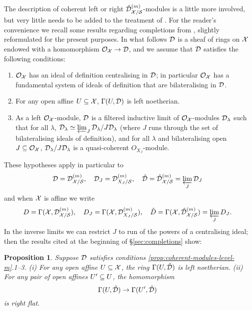 \documentclass{article}
\theoremstyle{change}
\newtheorem{prop}[subsubsection]{Proposition}
\numberwithin{equation}{subsubsection}
\newcommand{\demobox}{\vrule height6pt width6pt depth0pt}
\newcommand{\nodemo}{\unskip\nobreak\hfil\qquad
\demobox\parfillskip=0pt\par}
\begin{document}
The description of coherent left or right
${\hat{\cal D}}^{({m})}_{{\cal X}/{\cal S}}$-modules is a little more involved, but very
little needs to be added to the treatment of
\cite[\S3.3]{berthelot:1996}. For the reader's convenience we recall
some results regarding completions from \cite[\S3.3]{berthelot:1996},
slightly reformulated for the present purposes. In what follows ${\cal D}$
is a sheaf of rings on ${\cal X}$ endowed with a homomorphism
${\cal O}_{\cal X}\to{\cal D}$, and we assume that ${\cal D}$ satisfies the following
conditions:
\begin{enumerate}
\item ${\cal O}_{\cal X}$ has an ideal of definition centralising in ${\cal D}$; in
  particular ${\cal O}_{\cal X}$ has a fundamental system of ideals of definition
  that are bilateralising in ${\cal D}$.
\item For any open affine $U\subseteq{\cal X}$, $\Gamma(U,{\cal D})$ is left
  noetherian. 
\item As a left ${\cal O}_{\cal X}$-module, ${\cal D}$ is a filtered inductive limit of
  ${\cal O}_{\cal X}$-modules ${\cal D}_\lambda$ such that for all $\lambda$,
  ${\cal D}_\lambda\simeq\varprojlim_J{\cal D}_\lambda/J{\cal D}_\lambda$ (where $J$ runs
  through the set of bilateralising ideals of definition), and for all
  $\lambda$ and bilateralising open $J\subseteq{\cal O}_{\cal X}$,
  ${\cal D}_\lambda/J{\cal D}_\lambda$ is a quasi-coherent $O_{X_J}$-module.
\end{enumerate}

These hypotheses apply in particular to
\begin{displaymath}
  {\cal D}={{\cal D}}^{({m})}_{{\cal X}/{\cal S}},\quad
  {\cal D}_J={{\cal D}}^{({m})}_{X_J/{\cal S}},\quad
  \hat{\cal D}={\hat{\cal D}}^{({m})}_{{\cal X}/{\cal S}}=\varprojlim_J{\cal D}_J
\end{displaymath}
and when ${\cal X}$ is affine we write
\begin{displaymath}
  D=\Gamma({\cal X},{{\cal D}}^{({m})}_{{\cal X}/{\cal S}}),\quad
  D_J=\Gamma({\cal X},{{\cal D}}^{({m})}_{X_J/{\cal S}}),\quad
  \hat D=\Gamma({\cal X},{\hat{\cal D}}^{({m})}_{{\cal X}/{\cal S}})=\varprojlim_JD_J.
\end{displaymath}
In the inverse limits we can restrict $J$ to run of the powers of a
centralising ideal; then the results cited at the beginning of
\S\ref{sec:completions} show:

\begin{prop}
  Suppose ${\cal D}$ satisfies conditions
  \ref{prop:coherent-modules-level-m}.1--3. (i) For any open affine
  $U\subseteq{\cal X}$, the ring $\Gamma(U,\hat{{\cal D}})$ is left noetherian. (ii)
  For any pair of open affines $U'\subseteq U$, the homomorphism
  \begin{displaymath}
    \Gamma(U,\hat{{\cal D}})\to\Gamma(U',\hat{{\cal D}})
  \end{displaymath}
  is right flat.\nodemo
\end{prop}
\end{document}
